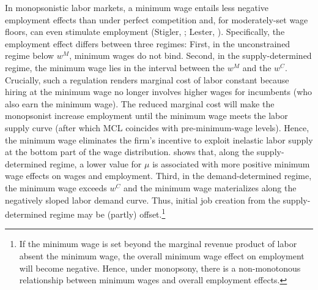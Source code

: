 \documentclass[11pt,oneside,reqno,xcolor=dvipsnames]{article} %
\begin{document}
In monopsonistic labor markets, a minimum wage entails less negative employment effects than under perfect competition and, for moderately-set wage floors, can even stimulate employment (Stigler, \citeyear{Stigler1946}; Lester, \citeyear{Lester1947}). Specifically, the employment effect differs between three regimes: First, in the unconstrained regime below $w^{M}$, minimum wages do not bind. Second, in the supply-determined regime, the minimum wage lies in the interval between the $w^{M}$ and the $w^{C}$. Crucially, such a regulation renders marginal cost of labor constant because hiring at the minimum wage no longer involves higher wages for incumbents (who also earn the minimum wage). The reduced marginal cost will make the monopsonist increase employment until the minimum wage meets the labor supply curve (after which MCL coincides with pre-minimum-wage levels). Hence, the minimum wage eliminates the firm's incentive to exploit inelastic labor supply at the bottom part of the wage distribution. \citet{Manning2011} shows that, along the supply-determined regime, a lower value for $\mu$ is associated with more positive minimum wage effects on wages and employment. Third, in the demand-determined regime, the minimum wage exceeds $w^{C}$ and the minimum wage materializes along the negatively sloped labor demand curve. Thus, initial job creation from the supply-determined regime may be (partly) offset.\footnote{If the minimum wage is set beyond the marginal revenue product of labor absent the minimum wage, the overall minimum wage effect on employment will become negative. Hence, under monopsony, there is a non-monotonous relationship between minimum wages and overall employment effects.}
\end{document}
